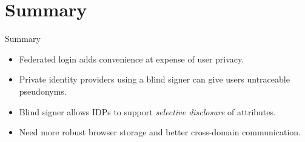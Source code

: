 \documentclass[handout]{beamer}
\begin{document}
\section*{Summary}

\begin{frame}{Summary}
  \begin{itemize}
    \item<1-> Federated login adds convenience at expense of user privacy.
    \item<2-> Private identity providers using a blind signer can give users
    untraceable pseudonyms.
    \item<3-> Blind signer allows IDPs to support \emph{selective disclosure} of
    attributes.
    \item<4-> Need more robust browser storage and better cross-domain
    communication.
  \end{itemize}
\end{frame}
\end{document}
